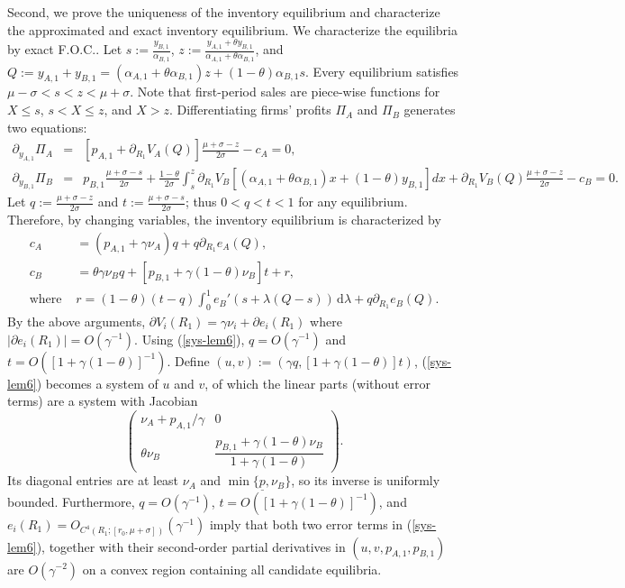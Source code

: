 \documentclass[nonblindrev,copyedit]{informs1}
\begin{document}
\begin{APPENDICES}
Second, we prove the uniqueness of the inventory equilibrium and characterize the approximated and exact inventory equilibrium. We characterize the equilibria by exact F.O.C..
Let $s:=\frac{y_{B,1}}{\alpha_{B,1}}$, $z:=\frac{y_{A,1}+\theta y_{B,1}}{\alpha_{A,1} + \theta \alpha_{B,1}}$, and $Q:=y_{A,1}+y_{B,1}=(\alpha_{A,1} + \theta \alpha_{B,1})z+(1-\theta)\alpha_{B,1}s$. Every equilibrium satisfies $\mu-\sigma < s < z < \mu+\sigma$. Note that first-period sales are piece-wise functions for $X \leq s$, $s < X \leq z$, and $X > z$. Differentiating firms' profits $\Pi_A$ and $\Pi_B$ generates two equations:
\begin{eqnarray*}
    \partial_{y_{A,1}} \Pi_A & = & [p_{A,1} + \partial_{R_1} V_A(Q)]\frac{\mu + \sigma - z}{2 \sigma} - c_A = 0, \\
    \partial_{y_{B,1}} \Pi_B & =& p_{B,1}\frac{\mu + \sigma - s}{2 \sigma} + \frac{1-\theta}{2 \sigma} \int_s^z \partial_{R_1} V_B[(\alpha_{A,1} + \theta \alpha_{B,1})x+(1-\theta)y_{B,1}]dx + \partial_{R_1}V_B(Q)\frac{\mu + \sigma - z}{2 \sigma} - c_B = 0.
\end{eqnarray*}
Let $q:=\frac{\mu+\sigma-z}{2\sigma}$ and $t:=\frac{\mu + \sigma-s}{2\sigma}$; thus $0 < q < t < 1$ for any equilibrium. Therefore, by changing variables, the inventory equilibrium is characterized by
\begin{equation}
\begin{aligned}
c_A&=(p_{A,1}+\gamma\nu_A)q+q \partial_{R_1} e_A(Q),\\
c_B&=\theta\gamma\nu_Bq+
 [p_{B,1}+\gamma(1-\theta)\nu_B]t+r,\\
\text{where } &r=(1-\theta)(t-q)
\int_0^1 e_B'(s+\lambda(Q-s))\,\mathrm{d}\lambda+q \partial_{R_1} e_B(Q).
\end{aligned} \label{sys-lem6}
\end{equation}
By the above arguments, $\partial V_i(R_1) = \gamma \nu_i + \partial e_i(R_1)$ where $|\partial e_i(R_1)| = O (\gamma^{-1})$. Using (\ref{sys-lem6}), $q=O(\gamma^{-1})$ and $t=O([1+\gamma(1-\theta)]^{-1})$. Define $(u, v) := (\gamma q,[1+\gamma(1-\theta)]t)$, (\ref{sys-lem6}) becomes a system of $u$ and $v$, of which the linear parts (without error terms) are a system with Jacobian
\[
\begin{pmatrix}
\nu_A+p_{A,1}/\gamma&0\\
\theta\nu_B&\dfrac{p_{B,1}+\gamma(1-\theta)\nu_B}{1+\gamma(1-\theta)}
\end{pmatrix}.
\]
Its diagonal entries are at least $\nu_A$ and $\min\{\underline{p},\nu_B\}$, so its inverse is uniformly bounded. Furthermore, $q=O(\gamma^{-1})$, $t=O([1+\gamma(1-\theta)]^{-1})$, and $e_i(R_1) = O_{C^4(R_1;[r_0,\mu+\sigma])}(\gamma^{-1})$ imply that both two error terms in (\ref{sys-lem6}), together with their second-order partial derivatives in $(u, v, p_{A, 1}, p_{B,1})$ are $O (\gamma^{-2})$ on a convex region containing all candidate equilibria.

\end{APPENDICES}
\end{document}
